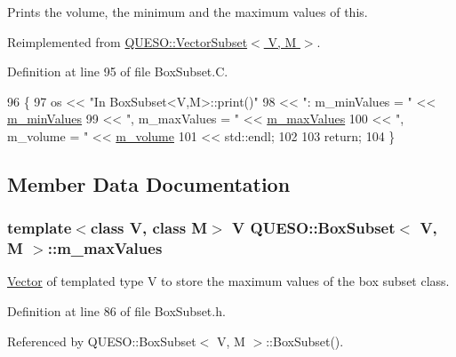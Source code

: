 Prints the volume, the minimum and the maximum values of {\ttfamily this}. 



Reimplemented from \hyperlink{class_q_u_e_s_o_1_1_vector_subset_a62ba8816790e495f7d2302afeaecb436}{Q\-U\-E\-S\-O\-::\-Vector\-Subset$<$ V, M $>$}.



Definition at line 95 of file Box\-Subset.\-C.


\begin{DoxyCode}
96 \{
97   os << \textcolor{stringliteral}{"In BoxSubset<V,M>::print()"}
98      << \textcolor{stringliteral}{": m\_minValues = "} << \hyperlink{class_q_u_e_s_o_1_1_box_subset_a633a4fbfa03590b38e4d2b192f3cc2b5}{m\_minValues}
99      << \textcolor{stringliteral}{", m\_maxValues = "} << \hyperlink{class_q_u_e_s_o_1_1_box_subset_ad234b8d38a236fb5c0d1353302c3e2f5}{m\_maxValues}
100      << \textcolor{stringliteral}{", m\_volume = "}    << \hyperlink{class_q_u_e_s_o_1_1_vector_set_acd5cdcdbcbbce29daec684437f511e9f}{m\_volume}
101      << std::endl;
102 
103   \textcolor{keywordflow}{return};
104 \}
\end{DoxyCode}


\subsection{Member Data Documentation}
\hypertarget{class_q_u_e_s_o_1_1_box_subset_ad234b8d38a236fb5c0d1353302c3e2f5}{
\subsubsection[{m\-\_\-max\-Values}]{\setlength{\rightskip}{0pt plus 5cm}template$<$class V, class M$>$ V {\bf Q\-U\-E\-S\-O\-::\-Box\-Subset}$<$ V, M $>$\-::m\-\_\-max\-Values\hspace{0.3cm}{\ttfamily [protected]}}}\label{class_q_u_e_s_o_1_1_box_subset_ad234b8d38a236fb5c0d1353302c3e2f5}


\hyperlink{class_q_u_e_s_o_1_1_vector}{Vector} of templated type {\ttfamily V} to store the maximum values of the box subset class. 



Definition at line 86 of file Box\-Subset.\-h.



Referenced by Q\-U\-E\-S\-O\-::\-Box\-Subset$<$ V, M $>$\-::\-Box\-Subset().


